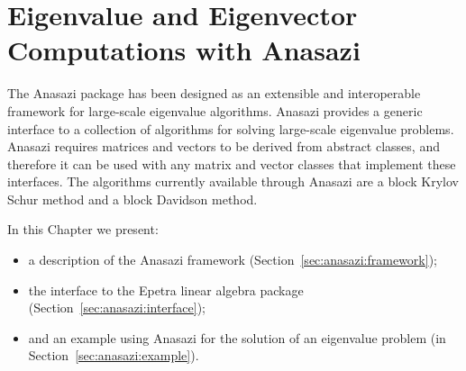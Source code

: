 % 
% 
% 
%   
%   
% 
% 

\section{Eigenvalue and Eigenvector Computations with Anasazi}
\label{chap:anasazi}

The Anasazi package has been designed as an extensible and
interoperable framework for large-scale eigenvalue algorithms. Anasazi
provides a generic interface to a collection of algorithms for solving
large-scale eigenvalue problems. Anasazi requires matrices and vectors
to be derived from abstract classes, and therefore it can be used with
any matrix and vector classes that implement these interfaces. The
algorithms currently available through Anasazi are a block Krylov
Schur method and a block Davidson method.

In this Chapter we present:
\begin{itemize}
\item a description of the Anasazi framework (Section~\ref{sec:anasazi:framework});
\item the interface to the Epetra linear algebra package (Section~\ref{sec:anasazi:interface});
\item and an example using Anasazi for the solution of an eigenvalue problem (in
 Section~\ref{sec:anasazi:example}).
\end{itemize}

